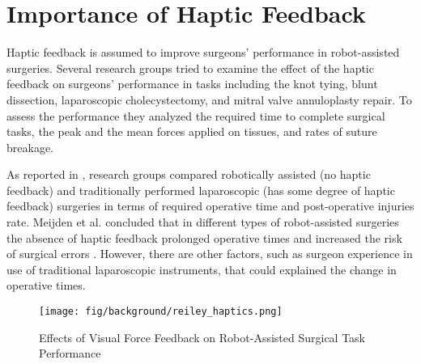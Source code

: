 

\section{Importance of Haptic Feedback}
\label{sec:hapticFeedbackImportance}

Haptic feedback is assumed to improve surgeons' performance in robot-assisted surgeries. Several research groups tried to examine the effect of the haptic feedback on surgeons' performance in tasks including the knot tying, blunt dissection, laparoscopic cholecystectomy, and mitral valve annuloplasty repair. To assess the performance they analyzed the required time to complete surgical tasks, the peak and the mean forces applied on tissues, and rates of suture breakage.

As reported in \cite{meijden_value_2009}, research groups \cite{delaney_comparison_2003, morino_randomized_2006, nakadi_evaluation_2006, kornprat_prospective_2006} compared robotically assisted (no haptic feedback) and traditionally performed laparoscopic (has some degree of haptic feedback) surgeries in terms of required operative time and post-operative injuries rate. Meijden et al. concluded that in different types of robot-assisted surgeries the absence of haptic feedback prolonged operative times and increased the risk of surgical errors \cite{meijden_value_2009}. However, there are other factors, such as surgeon experience in use of traditional laparoscopic instruments, that could explained the change in operative times.

\begin{figure}[h]
	\begin{center}
	\texttt{[image: fig/background/reiley\_haptics.png]}
	\end{center}
	\vspace{-4mm}
	\caption[Effects of Visual Force Feedback on Robot-Assisted Surgical Task Performance]
	{Effects of Visual Force Feedback on Robot-Assisted Surgical Task Performance \cite{reiley_effects_2008}}
	\label{fig:hapt_imp}
	\vspace{-2mm}
\end{figure}

